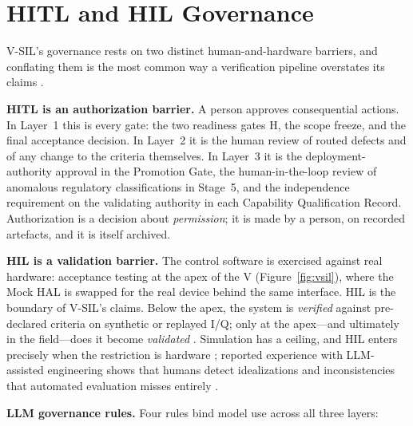 \documentclass[11pt,a4paper]{article}
\newcommand{\verified}{\emph{verified}}
\newcommand{\validated}{\emph{validated}}
\begin{document}
\section{HITL and HIL Governance}
\label{sec:governance}

V-SIL's governance rests on two distinct human-and-hardware barriers, and conflating them is the
most common way a verification pipeline overstates its claims \cite{opalrt2026,sheridan2026b}.

\textbf{HITL is an authorization barrier.} A person approves consequential actions. In Layer~1
this is every gate: the two readiness gates H, the scope freeze, and the final acceptance
decision. In Layer~2 it is the human review of routed defects and of any change to the criteria
themselves. In Layer~3 it is the deployment-authority approval in the Promotion Gate, the
human-in-the-loop review of anomalous regulatory classifications in Stage~5, and the
independence requirement on the validating authority in each Capability Qualification Record.
Authorization is a decision about \emph{permission}; it is made by a person, on recorded
artefacts, and it is itself archived.

\textbf{HIL is a validation barrier.} The control software is exercised against real hardware:
acceptance testing at the apex of the V (Figure~\ref{fig:vsil}), where the Mock HAL is swapped for the
real device behind the same interface. HIL is the boundary of V-SIL's claims. Below the apex, the
system is \verified{} against pre-declared criteria on synthetic or replayed I/Q; only at the
apex---and ultimately in the field---does it become \validated{} \cite{sheridan2026b}. Simulation
has a ceiling, and HIL enters precisely when the restriction is hardware \cite{opalrt2026};
reported experience with LLM-assisted engineering shows that humans detect idealizations and
inconsistencies that automated evaluation misses entirely \cite{heinrichs2026,bajestani2026}.

\textbf{LLM governance rules.} Four rules bind model use across all three layers:
\end{document}
